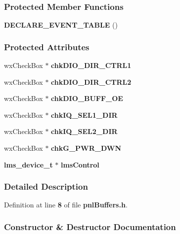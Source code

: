 \subsubsection*{Protected Member Functions}
\begin{DoxyCompactItemize}
\item 
{\bf D\+E\+C\+L\+A\+R\+E\+\_\+\+E\+V\+E\+N\+T\+\_\+\+T\+A\+B\+LE} ()
\end{DoxyCompactItemize}
\subsubsection*{Protected Attributes}
\begin{DoxyCompactItemize}
\item 
wx\+Check\+Box $\ast$ {\bf chk\+D\+I\+O\+\_\+\+D\+I\+R\+\_\+\+C\+T\+R\+L1}
\item 
wx\+Check\+Box $\ast$ {\bf chk\+D\+I\+O\+\_\+\+D\+I\+R\+\_\+\+C\+T\+R\+L2}
\item 
wx\+Check\+Box $\ast$ {\bf chk\+D\+I\+O\+\_\+\+B\+U\+F\+F\+\_\+\+OE}
\item 
wx\+Check\+Box $\ast$ {\bf chk\+I\+Q\+\_\+\+S\+E\+L1\+\_\+\+D\+IR}
\item 
wx\+Check\+Box $\ast$ {\bf chk\+I\+Q\+\_\+\+S\+E\+L2\+\_\+\+D\+IR}
\item 
wx\+Check\+Box $\ast$ {\bf chk\+G\+\_\+\+P\+W\+R\+\_\+\+D\+WN}
\item 
{\bf lms\+\_\+device\+\_\+t} $\ast$ {\bf lms\+Control}
\end{DoxyCompactItemize}


\subsubsection{Detailed Description}


Definition at line {\bf 8} of file {\bf pnl\+Buffers.\+h}.



\subsubsection{Constructor \& Destructor Documentation}
